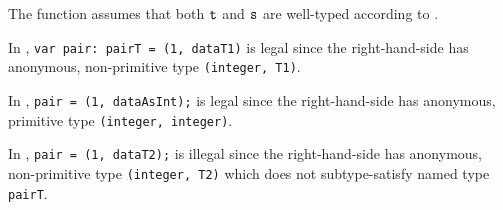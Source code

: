 The function assumes that both $\texttt{t}$ and $\texttt{s}$ are well-typed according to .

In ,
\texttt{var pair: pairT = (1, dataT1)} is legal since the right-hand-side has
anonymous, non-primitive type \texttt{(integer, T1)}.

In ,
\texttt{pair = (1, dataAsInt);} is legal since the right-hand-side has anonymous,
primitive type \texttt{(integer, integer)}.

In ,
\texttt{pair = (1, dataT2);} is illegal since the right-hand-side has anonymous,
non-primitive type \texttt{(integer, T2)} which does not subtype-satisfy named
type \texttt{pairT}.

